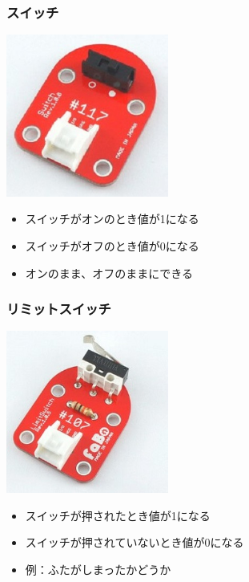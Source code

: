 \begin{frame}
    \frametitle{スイッチ}
    \begin{center}
        \includegraphics[width=0.4\textwidth]{images/chap05/text05-img019.jpg}
        \begin{itemize}
            \item スイッチがオンのとき値が1になる
            \item スイッチがオフのとき値が0になる
            \item オンのまま、オフのままにできる
        \end{itemize}
    \end{center}
\end{frame}

\begin{frame}
    \frametitle{リミットスイッチ}
    \begin{center}
        \includegraphics[width=0.4\textwidth]{images/chap05/text05-img020.jpg}
        \begin{itemize}
            \item スイッチが押されたとき値が1になる
            \item スイッチが押されていないとき値が0になる
            \item 例：ふたがしまったかどうか
        \end{itemize}
    \end{center}
\end{frame}

